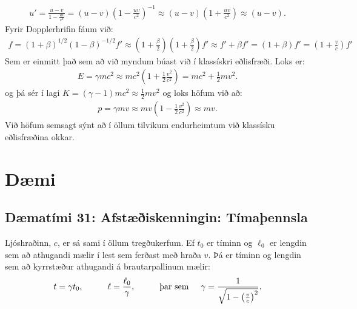 \ifdefined \wholebook \else\documentclass[oneside]{book}\usepackage{EdlBook}\graphicspath{{figures/}}
\begin{document}
\begin{align*}
    u' = \frac{u-v}{1 - \frac{uv}{c^2}} = (u-v)\left(1 - \frac{uv}{c^2} \right)^{-1} \approx (u-v)\left(1 + \frac{uv}{c^2} \right) \approx (u-v).
\end{align*}
Fyrir Dopplerhrifin fáum við:
\begin{align*}
    f = \left(1 + \beta \right)^{1/2}\left(1 - \beta \right)^{-1/2} f' \approx \left(1 + \frac{\beta}{2} \right) \left(1 + \frac{\beta}{2} \right)f' \approx f' + \beta f' = (1+\beta)f' = \left(1 + \frac{v}{c} \right)f'
\end{align*}
Sem er einmitt það sem að við myndum búast við í klassískri eðlisfræði. Loks er:
\begin{align*}
    E = \gamma mc^2 \approx mc^2 \left(1 + \frac{1}{2}\frac{v^2}{c^2} \right) = mc^2 + \frac{1}{2}mv^2.
\end{align*}
og þá sér í lagi $K = (\gamma -1)mc^2 \approx \frac{1}{2}mv^2$ og loks höfum við að:
\begin{align*}
    p = \gamma mv \approx mv\left(1 - \frac{1}{2}\frac{v^2}{c^2} \right) \approx mv.
\end{align*}
Við höfum semsagt sýnt að í öllum tilvikum endurheimtum við klassísku eðlisfræðina okkar.


\newpage

\section{Dæmi}

\subsection*{Dæmatími 31: Afstæðiskenningin: Tímaþennsla}

\begin{tcolorbox}
Ljóshraðinn, $c$, er sá sami í öllum tregðukerfum. Ef $t_0$ er tíminn og $\ell_0$ er lengdin sem að athugandi mælir í lest sem ferðast með hraða $v$. Þá er tíminn og lengdin sem að kyrrstæður athugandi á brautarpallinum mælir:
\begin{align*}
    t = \gamma t_0, \hspace{1cm} \ell = \frac{\ell_0}{\gamma}, \hspace{1cm} \text{þar sem} \hspace{0.5cm} \gamma = \frac{1}{\sqrt{1-\left(\frac{v}{c}\right)^2}}.
\end{align*}
\end{tcolorbox}
\end{document}
